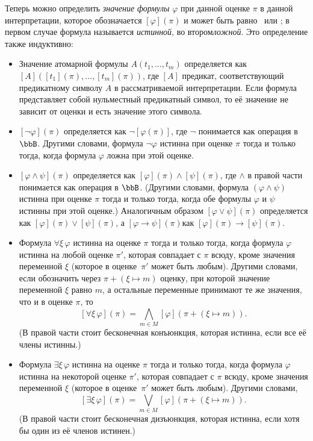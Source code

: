 Теперь можно определить \emph{значение формулы}%
%
$\varphi$ при
данной оценке $\pi$ в данной интерпретации, которое обозначается
$[\varphi](\pi)$ и может быть равно
\И\ или \Л; в первом случае
формула называется \emph{истинной},%
%
во втором\т \emph{ложной}.%
%
Это определение также индуктивно:
       \begin{itemize}
       \item
Значение атомарной формулы $A(t_1,\dots,t_m)$ определяется
как $[A]([t_1](\pi),\dots,[t_m](\pi))$, где $[A]$\т
предикат, соответствующий предикатному символу $A$ в
рассматриваемой интерпретации. Если формула
представляет собой нульместный предикатный символ, то её
значение не зависит от оценки и есть значение этого
символа.
        \item
$[\lnot \varphi](\pi)$ определяется как $\lnot [\varphi(\pi)]$,
где $\lnot$ понимается как операция в $\bbB$. Другими словами,
формула $\lnot \varphi$ истинна при оценке $\pi$ тогда и только
тогда, когда формула $\varphi$ ложна при этой оценке.
        \item
$[\varphi \land \psi](\pi)$ определяется как
$[\varphi](\pi)\land [\psi](\pi)$, где $\land$ в правой
части понимается как операция в $\bbB$. (Другими словами,
формула $(\varphi\land\psi)$ истинна при оценке $\pi$
тогда и только тогда, когда обе формулы $\varphi$ и
$\psi$ истинны при этой оценке.) Аналогичным образом
$[\varphi \lor \psi](\pi)$ определяется как
$[\varphi](\pi)\lor [\psi](\pi)$,  а
$[\varphi \to \psi](\pi)$\т как
$[\varphi](\pi)\to [\psi](\pi)$.
        \item
Формула $\forall \xi\,\varphi$ истинна на оценке $\pi$ тогда и
только тогда, когда формула $\varphi$ истинна на любой оценке
$\pi'$, которая совпадает с $\pi$ всюду, кроме значения
переменной $\xi$ (которое в оценке~$\pi'$
может быть любым).
Другими словами, если обозначить через $\pi+(\xi\mapsto m)$
оценку, при которой значение переменной $\xi$ равно $m$,
а остальные переменные принимают те же значения, что и
в оценке $\pi$, то
        $$
[\forall \xi\, \varphi](\pi)=
      \bigwedge_{m\in M} [\varphi](\pi+(\xi\mapsto m)).
        $$
(В правой части стоит бесконечная конъюнкция,
которая истинна, если все её члены истинны.)
        \item
Формула $\exists \xi\,\varphi$ истинна на оценке $\pi$ тогда и
только тогда, когда формула $\varphi$ истинна на некоторой оценке
$\pi'$, которая совпадает с $\pi$ всюду, кроме значения
переменной $\xi$ (которое в оценке~$\pi'$
может быть любым). Другими словами,
        $$
[\exists \xi\, \varphi](\pi)=
      \bigvee_{m\in M} [\varphi](\pi+(\xi\mapsto m)).
        $$
(В правой части стоит бесконечная дизъюнкция,
которая истинна, если хотя бы один из её членов
истинен.)
\end{itemize}


